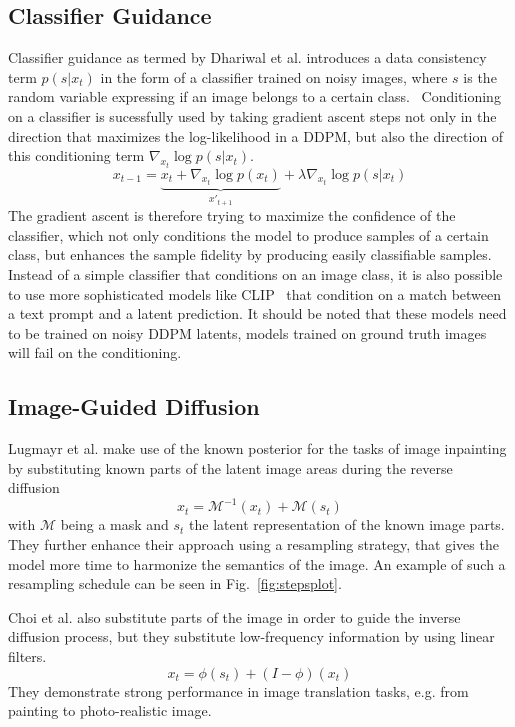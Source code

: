 \subsection{Classifier Guidance}
\label{sec:classifierguidance}
Classifier guidance as termed by Dhariwal et al. introduces a data consistency term $p(s|x_t)$ in the form of a classifier trained on noisy images, where $s$ is the random variable expressing if an image belongs to a certain class.~\autocite{dhariwal2021diffusion,sohldickstein2015deep} Conditioning on a classifier is sucessfully used by taking gradient ascent steps not only in the direction that maximizes the log-likelihood in a DDPM, but also the direction of this conditioning term $\nabla_{x_t} \log p(s|x_t)$.
\begin{equation}
    x_{t-1} = \underbrace{x_{t} + \nabla_{x_t} \log p(x_t)}_{x'_{t+1}} + \lambda \nabla_{x_t} \log p(s|x_t)
\end{equation}
The gradient ascent is therefore trying to maximize the confidence of the classifier, which not only conditions the model to produce samples of a certain class, but enhances the sample fidelity by producing easily classifiable samples.~\autocite{dhariwal2021diffusion} Instead of a simple classifier that conditions on an image class, it is also possible to use more sophisticated models like CLIP~\autocite{radford2021learning} that condition on a match between a text prompt and a latent prediction. It should be noted that these models need to be trained on noisy DDPM latents, models trained on ground truth images will fail on the conditioning.
\subsection{Image-Guided Diffusion}
\label{sec:imageguidance}
Lugmayr et al. make use of the known posterior for the tasks of image inpainting by substituting known parts of the latent image areas during the reverse diffusion~\autocite{lugmayr2022repaint}
\begin{equation}
    x_{t} = \mathcal{M}^{-1}(x_t) + \mathcal{M}(s_t)
\end{equation}
with $\mathcal{M}$ being a mask and $s_t$ the latent representation of the known image parts. They further enhance their approach using a resampling strategy, that gives the model more time to harmonize the semantics of the image. An example of such a resampling schedule can be seen in Fig.~\ref{fig:stepsplot}.

Choi et al. also substitute parts of the image in order to guide the inverse diffusion process, but they substitute low-frequency information by using linear filters.~\autocite{choi2021ilvr}
\begin{equation}
    x_{t} = \phi(s_{t}) + (I - \phi) (x_{t})
\end{equation}
They demonstrate strong performance in image translation tasks, e.g. from painting to photo-realistic image.